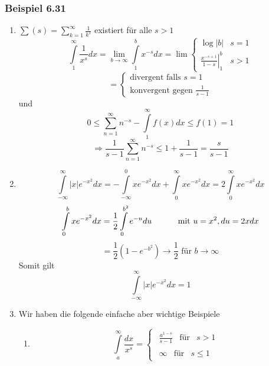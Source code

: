 \subsubsection*{Beispiel 6.31}%
\begin{enumerate}
\item $\sum {(s) = \sum\limits_{k = 1}^\infty  {\frac{1}{{{k^s}}}} } $ existiert für alle $s>1$ 
$$\int\limits_1^\infty  {\frac{1}{{{x^s}}}dx}  = \mathop {\lim }\limits_{b \to \infty } \int\limits_1^b {{x^{ - s}}dx}  = \lim \left\{ {\begin{array}{*{20}{c}}
{\log \left| b \right|}&{s = 1}\\
{\left. {\frac{{{x^{ - s + 1}}}}{{1 - s}}} \right|_1^b}&{s > 1}
\end{array}} \right. $$
$$= \left\{ {\begin{array}{*{20}{c}}
{\text{divergent falls }s = 1}\\
{\text{konvergent gegen }\frac{1}{{s - 1}}}
\end{array}} \right.$$
und
\[0 \le \sum\limits_{n = 1}^\infty  {{n^{ - s}}}  - \int\limits_1^\infty  {f(x)dx}  \le f(1) = 1\]
\[ \Rightarrow \frac{1}{{s - 1}}\sum\limits_{n = 1}^\infty  {{n^{ - s}}}  \le 1 + \frac{1}{{s - 1}} = \frac{s}{{s - 1}}\]
\item \[\int\limits_{ - \infty }^\infty  {\left| x \right|{e^{ - {x^2}}}dx}  =  - \int\limits_{ - \infty }^0 {x{e^{ - {x^2}}}dx}  + \int\limits_0^\infty  {x{e^{ - {x^2}}}dx}  = 2\int\limits_0^\infty  {x{e^{ - {x^2}}}dx} \]
\[\int\limits_0^b {x{e^{ - {x^2}}}dx = \frac{1}{2}\int\limits_0^{{b^2}} {{e^{ - u}}du} }\text{\hspace{10mm} mit }u=x^2, du=2xdx \]
\[ = \frac{1}{2}\left( {1 - {e^{ - {b^2}}}} \right) \to \frac{1}{2}\text{ für }b\to \infty\]
Somit gilt \[\int\limits_{ - \infty }^\infty  {\left| x \right|{e^{ - {x^2}}}dx = 1} \]
\item Wir haben die folgende einfache aber wichtige Beispiele
\begin{enumerate}
\item \[\int\limits_{ a }^\infty  {\frac{{dx}}{{{x^s}}}}  = \left\{ {\begin{array}{*{20}{c}}
{\begin{array}{*{20}{c}}
{\frac{{{a^{1 - s}}}}{{s - 1}}}&\text{für}&{s > 1}
\end{array}}\\
{\begin{array}{*{20}{c}}
\infty &{{\text{für}}}&{s \le 1}
\end{array}}
\end{array}} \right.\]


\end{enumerate}
\end{enumerate}

